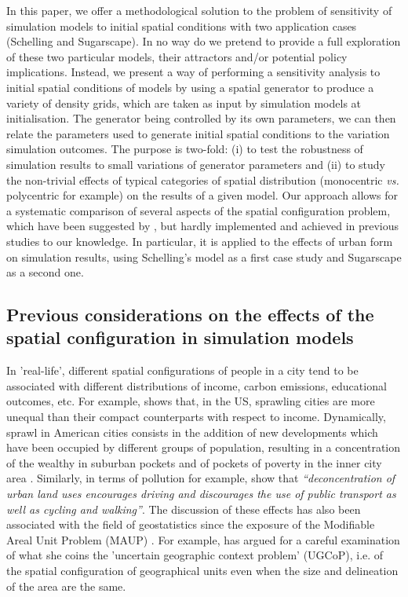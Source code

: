 \documentclass{JASSS}
\begin{document}
In this paper, we offer a methodological solution to the problem of sensitivity of simulation models to initial spatial conditions with two application cases (Schelling and Sugarscape). In no way do we pretend to provide a full exploration of these two particular models, their attractors and/or potential policy implications. Instead, we present a way of performing a sensitivity analysis to initial spatial conditions of models by using a spatial generator to produce a variety of density grids, which are taken as input by simulation models at initialisation. The generator being controlled by its own parameters, we can then relate the parameters used to generate initial spatial conditions to the variation simulation outcomes. The purpose is two-fold: (i) to test the robustness of simulation results to small variations of generator parameters and (ii) to study the non-trivial effects of typical categories of spatial distribution (monocentric \textit{vs.} polycentric for example) on the results of a given model. Our approach allows for a systematic comparison of several aspects of the spatial configuration problem, which have been suggested by \citet{filatova2013spatial}, but hardly implemented and achieved in previous studies to our knowledge. In particular, it is applied to the effects of urban form on simulation results, using Schelling's model as a first case study and Sugarscape as a second one. 

\subsection{Previous considerations on the effects of the spatial configuration in simulation models}

In 'real-life', different spatial configurations of people in a city tend to be associated with different distributions of income, carbon emissions, educational outcomes, etc. For example, \citet{wheeler2006urban} shows that, in the US, sprawling cities are more unequal than their compact counterparts with respect to income. Dynamically, sprawl in American cities consists in the addition of new developments which have been occupied by different groups of population, resulting in a concentration of the wealthy in suburban pockets and of pockets of poverty in the inner city area \citep{jargowsky2002sprawl}. Similarly, in terms of pollution for example, \citet[p.173]{schwanen2001travel} show that \textit{``deconcentration of urban land uses encourages driving and discourages the use of public transport as well as cycling and walking''}. The discussion of these effects has also been associated with the field of geostatistics since the exposure of the Modifiable Areal Unit Problem (MAUP) \citep{Openshaw1984, FotheringhamWong1991}. For example, \citet{Kwan2012} has argued for a careful examination of what she coins the 'uncertain geographic context problem' (UGCoP), i.e. of the spatial configuration of geographical units even when the size and delineation of the area are the same.\\
\end{document}
